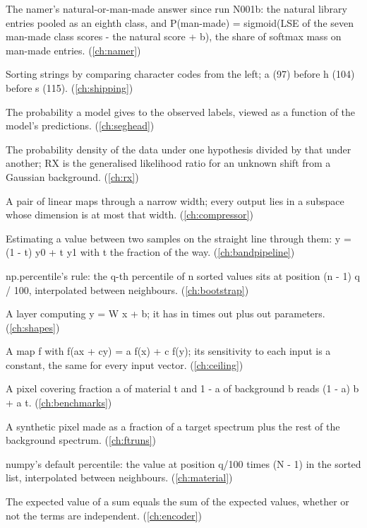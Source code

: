 \begin{description}[style=nextline,leftmargin=1.2em,font=\normalfont\bfseries]
\item[Level 1 by matching] The namer's natural-or-man-made answer since run N001b: the natural library entries pooled as an eighth class, and P(man-made) = sigmoid(LSE of the seven man-made class scores - the natural score + b), the share of softmax mass on man-made entries. (\cref{ch:namer})
\item[Lexicographic order] Sorting strings by comparing character codes from the left; a (97) before h (104) before s (115). (\cref{ch:shipping})
\item[Likelihood] The probability a model gives to the observed labels, viewed as a function of the model's predictions. (\cref{ch:seghead})
\item[Likelihood ratio] The probability density of the data under one hypothesis divided by that under another; RX is the generalised likelihood ratio for an unknown shift from a Gaussian background. (\cref{ch:rx})
\item[Linear bottleneck] A pair of linear maps through a narrow width; every output lies in a subspace whose dimension is at most that width. (\cref{ch:compressor})
\item[Linear interpolation] Estimating a value between two samples on the straight line through them: y = (1 - t) y0 + t y1 with t the fraction of the way. (\cref{ch:bandpipeline})
\item[Linear interpolation (percentiles)] np.percentile's rule: the q-th percentile of n sorted values sits at position (n - 1) q / 100, interpolated between neighbours. (\cref{ch:bootstrap})
\item[Linear layer] A layer computing y = W x + b; it has in times out plus out parameters. (\cref{ch:shapes})
\item[Linear map] A map f with f(ax + cy) = a f(x) + c f(y); its sensitivity to each input is a constant, the same for every input vector. (\cref{ch:ceiling})
\item[Linear mixing model] A pixel covering fraction a of material t and 1 - a of background b reads (1 - a) b + a t. (\cref{ch:benchmarks})
\item[Linear mixture] A synthetic pixel made as a fraction of a target spectrum plus the rest of the background spectrum. (\cref{ch:ftruns})
\item[Linear-interpolation percentile] numpy's default percentile: the value at position q/100 times (N - 1) in the sorted list, interpolated between neighbours. (\cref{ch:material})
\item[Linearity of expectation] The expected value of a sum equals the sum of the expected values, whether or not the terms are independent. (\cref{ch:encoder})

\end{description}
